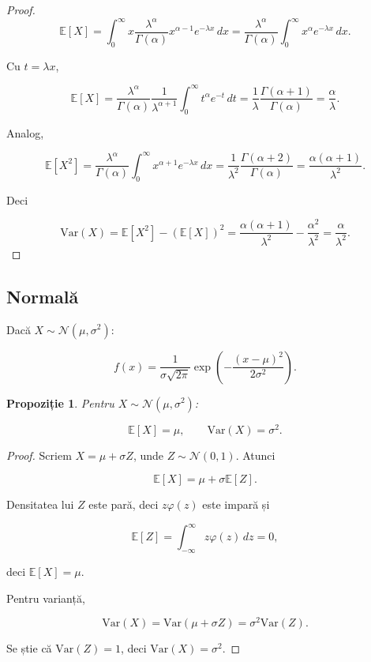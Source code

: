 \documentclass[12pt]{article}
\theoremstyle{plain}
\newtheorem{proposition}{Propoziție}
\begin{document}
\begin{proof}


\[
\mathbb{E}[X] = \int_0^\infty x \frac{\lambda^\alpha}{\Gamma(\alpha)} x^{\alpha-1} e^{-\lambda x}\,dx
= \frac{\lambda^\alpha}{\Gamma(\alpha)}\int_0^\infty x^\alpha e^{-\lambda x}\,dx.
\]


Cu $t=\lambda x$,


\[
\mathbb{E}[X] = \frac{\lambda^\alpha}{\Gamma(\alpha)}\frac{1}{\lambda^{\alpha+1}}\int_0^\infty t^\alpha e^{-t}\,dt
= \frac{1}{\lambda}\frac{\Gamma(\alpha+1)}{\Gamma(\alpha)} = \frac{\alpha}{\lambda}.
\]


Analog,


\[
\mathbb{E}[X^2] = \frac{\lambda^\alpha}{\Gamma(\alpha)}\int_0^\infty x^{\alpha+1} e^{-\lambda x}\,dx
= \frac{1}{\lambda^2}\frac{\Gamma(\alpha+2)}{\Gamma(\alpha)} = \frac{\alpha(\alpha+1)}{\lambda^2}.
\]


Deci


\[
\mathrm{Var}(X) = \mathbb{E}[X^2] - (\mathbb{E}[X])^2
= \frac{\alpha(\alpha+1)}{\lambda^2} - \frac{\alpha^2}{\lambda^2}
= \frac{\alpha}{\lambda^2}.
\]


\end{proof}

\subsection{Normală}

Dacă $X \sim \mathcal{N}(\mu,\sigma^2)$:


\[
f(x) = \frac{1}{\sigma\sqrt{2\pi}}\exp\left(-\frac{(x-\mu)^2}{2\sigma^2}\right).
\]



\begin{proposition}
Pentru $X \sim \mathcal{N}(\mu,\sigma^2)$:


\[
\mathbb{E}[X] = \mu,\qquad
\mathrm{Var}(X) = \sigma^2.
\]


\end{proposition}

\begin{proof}
Scriem $X = \mu + \sigma Z$, unde $Z \sim \mathcal{N}(0,1)$.
Atunci


\[
\mathbb{E}[X] = \mu + \sigma \mathbb{E}[Z].
\]


Densitatea lui $Z$ este pară, deci $z\varphi(z)$ este impară și


\[
\mathbb{E}[Z] = \int_{-\infty}^\infty z\varphi(z)\,dz = 0,
\]


deci $\mathbb{E}[X]=\mu$.

Pentru varianță,


\[
\mathrm{Var}(X) = \mathrm{Var}(\mu + \sigma Z) = \sigma^2 \mathrm{Var}(Z).
\]


Se știe că $\mathrm{Var}(Z)=1$, deci $\mathrm{Var}(X)=\sigma^2$.
\end{proof}
\end{document}
